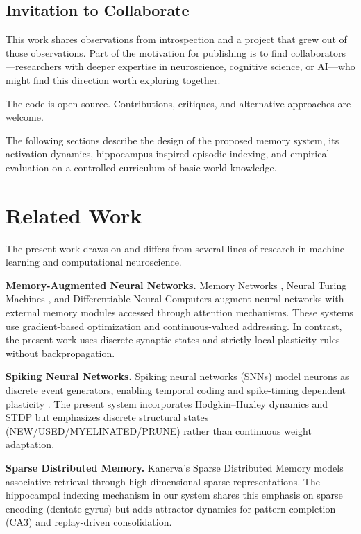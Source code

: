\documentclass[11pt]{article}
\begin{document}
\subsection{Invitation to Collaborate}

This work shares observations from introspection and a project that grew out of those observations. Part of the motivation for publishing is to find collaborators---researchers with deeper expertise in neuroscience, cognitive science, or AI---who might find this direction worth exploring together.

The code is open source. Contributions, critiques, and alternative approaches are welcome.

The following sections describe the design of the proposed memory system, its activation dynamics, hippocampus-inspired episodic indexing, and empirical evaluation on a controlled curriculum of basic world knowledge.

\section{Related Work}

The present work draws on and differs from several lines of research in machine learning and computational neuroscience.

\textbf{Memory-Augmented Neural Networks.} Memory Networks \citep{weston2014memory}, Neural Turing Machines \citep{graves2014neural}, and Differentiable Neural Computers \citep{graves2016hybrid} augment neural networks with external memory modules accessed through attention mechanisms. These systems use gradient-based optimization and continuous-valued addressing. In contrast, the present work uses discrete synaptic states and strictly local plasticity rules without backpropagation.

\textbf{Spiking Neural Networks.} Spiking neural networks (SNNs) model neurons as discrete event generators, enabling temporal coding and spike-timing dependent plasticity \citep{maass1997networks,gerstner2002spiking}. The present system incorporates Hodgkin--Huxley dynamics and STDP but emphasizes discrete structural states (NEW/USED/MYELINATED/PRUNE) rather than continuous weight adaptation.

\textbf{Sparse Distributed Memory.} Kanerva's Sparse Distributed Memory \citep{kanerva1988sparse} models associative retrieval through high-dimensional sparse representations. The hippocampal indexing mechanism in our system shares this emphasis on sparse encoding (dentate gyrus) but adds attractor dynamics for pattern completion (CA3) and replay-driven consolidation.
\end{document}
